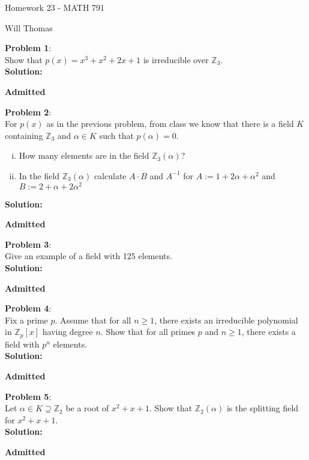 \documentclass[11pt]{article}
\newcommand{\prob}[3]{\begin{flushleft}
        \textbf{Problem #1}: \\
        #2 
		\textbf{Solution:} 
		#3

\end{flushleft}}
\newcommand{\admit}{
  \begin{flushright}
    \textbf{Admitted}
  \end{flushright}
}
\newcommand{\makeHWtitle}[1]{
    \begin{center}
    \Large{Homework #1 - MATH 791} 
        \vspace{5pt}
        
        \normalsize{Will Thomas}
        \vspace{5pt}
    \end{center}
}
\begin{document}
\makeHWtitle{23}

\prob{1}{
  Show that $p(x) = x^3 + x^2 + 2x + 1$ is irreducible over $\mathbb{Z}_3$. \\
}{ \\
  \admit
}

\prob{2}{
  For $p(x)$ as in the previous problem, from class we know that there is a field $K$ containing $\mathbb{Z}_3$ and $\alpha \in K$ such that $p(\alpha) = 0$.
  \begin{enumerate}[(i)]
    \item How many elements are in the field $\mathbb{Z}_3(\alpha)$?
    \item In the field $\mathbb{Z}_3(\alpha)$ calculate $A \cdot B$ and $A^{-1}$ for
          $A := 1 + 2 \alpha + \alpha^2$ and $B := 2 + \alpha + 2 \alpha^2$
  \end{enumerate}
}{ \\
  \admit
}

\prob{3}{
  Give an example of a field with 125 elements. \\
}{ \\
  \admit
}

\prob{4}{
Fix a prime $p$. Assume that for all $n \geq 1$, there exists an irreducible polynomial in $\mathbb{Z}_p[x]$ having degree $n$. Show that for all primes $p$ and $n \geq 1$, there exists a field with $p^n$ elements. \\
}{ \\
\admit
}

\prob{5}{
  Let $\alpha \in K \supseteq \mathbb{Z}_2$ be a root of $x^2 + x + 1$.
  Show that $\mathbb{Z}_2(\alpha)$ is the splitting field for $x^2 + x + 1$. \\
}{\\
\admit
}
\end{document}

